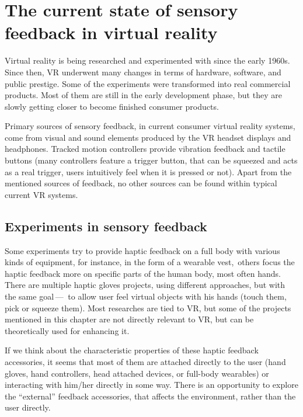 \chapter{The current state of sensory feedback in virtual reality}\label{currentstate}

Virtual reality is being researched and experimented with since the early 1960s.
\cite{vrhistory} Since then, VR underwent many changes in terms of hardware,
software, and public prestige.
Some of the experiments were transformed into real commercial products.
Most of them are still in the early development phase, but they are slowly getting
closer to become finished consumer products.


Primary sources of sensory feedback, in current consumer virtual reality systems,
come from visual and sound elements produced by the VR headset displays and
headphones. Tracked
motion controllers provide vibration feedback and tactile buttons (many 
controllers feature a trigger button, that can be squeezed and acts as
a real trigger, users intuitively feel when it is pressed or not).
Apart from the mentioned sources of feedback, no other sources can be found
within typical current VR systems.


\section{Experiments in sensory feedback}
Some experiments try to provide haptic feedback on a full body with various
kinds of equipment, for instance, in the form of a wearable vest,\,\cite{tfbhf}
others focus the haptic feedback more on specific parts of the
human body, most often hands.\,\cite{haptgloves} There are multiple haptic gloves 
projects, using different approaches, but with the same goal — 
to allow user feel virtual objects with his hands
(touch them, pick or squeeze them). Most researches are tied to VR,
but some of the projects mentioned in this chapter are not directly relevant
to VR, but can be theoretically used for enhancing it.

If we think about the characteristic properties of these haptic feedback
accessories, it seems that most of them are attached directly to the
user (hand gloves, hand controllers, head attached devices, or full-body wearables)
or interacting with him/her directly in some way. There is an opportunity to explore
the ``external'' feedback accessories, that affects the environment, rather than
the user directly.

\pagebreak

